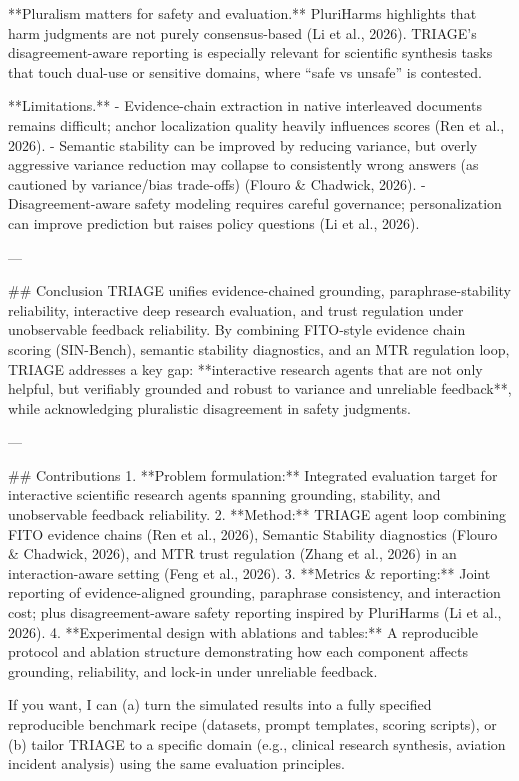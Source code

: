 **Pluralism matters for safety and evaluation.** PluriHarms highlights that harm judgments are not purely consensus-based (Li et al., 2026). TRIAGE’s disagreement-aware reporting is especially relevant for scientific synthesis tasks that touch dual-use or sensitive domains, where “safe vs unsafe” is contested.  

**Limitations.**  
- Evidence-chain extraction in native interleaved documents remains difficult; anchor localization quality heavily influences scores (Ren et al., 2026).  
- Semantic stability can be improved by reducing variance, but overly aggressive variance reduction may collapse to consistently wrong answers (as cautioned by variance/bias trade-offs) (Flouro & Chadwick, 2026).  
- Disagreement-aware safety modeling requires careful governance; personalization can improve prediction but raises policy questions (Li et al., 2026).

---

## Conclusion  
TRIAGE unifies evidence-chained grounding, paraphrase-stability reliability, interactive deep research evaluation, and trust regulation under unobservable feedback reliability. By combining FITO-style evidence chain scoring (SIN-Bench), semantic stability diagnostics, and an MTR regulation loop, TRIAGE addresses a key gap: **interactive research agents that are not only helpful, but verifiably grounded and robust to variance and unreliable feedback**, while acknowledging pluralistic disagreement in safety judgments.

---

## Contributions  
1. **Problem formulation:** Integrated evaluation target for interactive scientific research agents spanning grounding, stability, and unobservable feedback reliability.  
2. **Method:** TRIAGE agent loop combining FITO evidence chains (Ren et al., 2026), Semantic Stability diagnostics (Flouro & Chadwick, 2026), and MTR trust regulation (Zhang et al., 2026) in an interaction-aware setting (Feng et al., 2026).  
3. **Metrics & reporting:** Joint reporting of evidence-aligned grounding, paraphrase consistency, and interaction cost; plus disagreement-aware safety reporting inspired by PluriHarms (Li et al., 2026).  
4. **Experimental design with ablations and tables:** A reproducible protocol and ablation structure demonstrating how each component affects grounding, reliability, and lock-in under unreliable feedback.

If you want, I can (a) turn the simulated results into a fully specified reproducible benchmark recipe (datasets, prompt templates, scoring scripts), or (b) tailor TRIAGE to a specific domain (e.g., clinical research synthesis, aviation incident analysis) using the same evaluation principles.